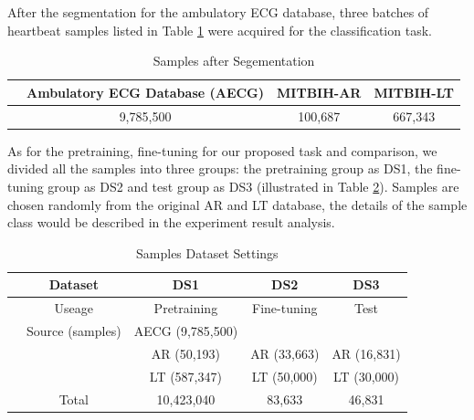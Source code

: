 \documentclass{bmcart}
\begin{document}
After the segmentation for the ambulatory ECG database, three batches of heartbeat samples listed in Table \ref{table1} were acquired for the classification task. 

\begin{table}[!htbp]
\begin{center}
\begin{threeparttable}
\caption{Samples after Segementation}

\label{table1}
\begin{tabular}{cccc}
\hline
& Ambulatory ECG Database (AECG) & MITBIH-AR &  MITBIH-LT\\
\hline
& 9,785,500 & 100,687 &  667,343 \\
\hline
\end{tabular}
\end{threeparttable}
\end{center}
\end{table}

As for the pretraining, fine-tuning for our proposed task and comparison, we divided all the samples into three groups: the pretraining group as DS1, the fine-tuning group as DS2 and test group as DS3 (illustrated in Table \ref{table2}). Samples are chosen randomly from the original AR and LT database, the details of the sample class would be described in the experiment result analysis.

\begin{table}[!htbp]
\begin{center}
\begin{threeparttable}
\caption{Samples Dataset Settings}
\label{table2}
\begin{tabular}{ccccc}
\hline
& Dataset & DS1& DS2    &  DS3\\
\hline
& Useage  & Pretraining & Fine-tuning & Test \\
\hline
& Source (samples) & AECG (9,785,500)   &  &   \\
&  & AR (50,193)   & AR (33,663) & AR (16,831) \\
&  & LT (587,347)  & LT (50,000) & LT (30,000) \\
\hline
&Total & 10,423,040 & 83,633 & 46,831 \\
\hline
\end{tabular}
\end{threeparttable}
\end{center}
\end{table}
\end{document}
